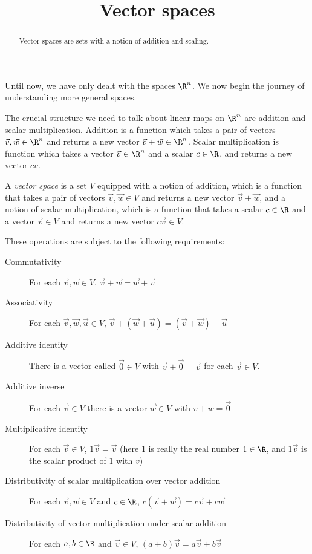\documentclass{ximera}
\title{Vector spaces}
\begin{document}
\begin{abstract}
  Vector spaces are sets with a notion of addition and scaling.
\end{abstract}\maketitle

Until now, we have only dealt with the spaces $\R^n$.  We now begin the journey of understanding more general spaces.  
	
The crucial structure we need to talk about linear maps on $\R^n$ are addition and scalar multiplication.  Addition is a function which takes a 
pair of vectors $\vec{v},\vec{w} \in \R^n$ and returns a new vector $\vec{v}+\vec{w} \in \R^n$.  Scalar multiplication is function which takes a vector $\vec{v} \in \R^n$  and 
a scalar $c \in \R$, and returns a new vector $cv$.  
	
\begin{definition}
  A \textit{vector space} is a set $V$ equipped with a notion of addition, which is a function that takes a pair of vectors $\vec{v},\vec{w} \in V$ and returns 
  a new vector $\vec{v}+\vec{w}$, and a notion of scalar multiplication, which is a function that takes a scalar $c \in \R$ and a vector $\vec{v} \in V$ and returns a 
  new vector $c\vec{v} \in V$.
		
  These operations are subject to the following requirements:
		
  \begin{description}
  \item[Commutativity] For each $\vec{v},\vec{w} \in V$, $ \vec{v} +\vec{w} = \vec{w}+\vec{v}$
  \item[Associativity] For each $\vec{v},\vec{w},\vec{u} \in V$, $\vec{v} +(\vec{w} +\vec{u}) = (\vec{v} +\vec{w}) +\vec{u}$
  \item[Additive identity] There is a vector called $\vec{0} \in V$ with $\vec{v}+\vec{0} = \vec{v}$ for each $\vec{v} \in V$.
  \item[Additive inverse] For each $\vec{v} \in V$ there is a vector $\vec{w} \in V$ with $v+w = \vec{0}$
  \item[Multiplicative identity] For each $\vec{v} \in V$, $1\vec{v}= \vec{v}$ (here $1$ is really the real number $1 \in \R$, and $1\vec{v}$ is the
    scalar product of $1$ with $v$)
  \item[Distributivity of scalar multiplication over vector addition]  For each $\vec{v},\vec{w} \in V$ and $c \in \R$, $c(\vec{v}+\vec{w}) = c\vec{v} + c\vec{w}$
  \item[Distributivity of vector  multiplication under scalar addition] For each $a,b \in \R$ and $\vec{v} \in V$, $(a+b)\vec{v} = a\vec{v}+b\vec{v}$
  \end{description}
\end{definition}
\end{document}
